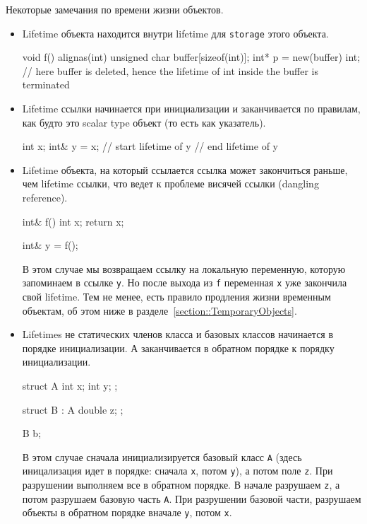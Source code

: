 \documentclass{article}
\begin{document}
Некоторые замечания по времени жизни объектов.
\begin{itemize}
\item Lifetime объекта находится внутри lifetime для \verb"storage" этого объекта.
\begin{cppcode}[\nonumbers]
void f() {
  alignas(int) unsigned char buffer[sizeof(int)];
  int* p = new(buffer) int;
} // here buffer is deleted, hence the lifetime of int inside the buffer is terminated
\end{cppcode}

\item Lifetime ссылки начинается при инициализации и заканчивается по правилам, как будто это scalar type объект (то есть как указатель).
\begin{cppcode}[\nonumbers]
int x;
{
  int& y = x; // start lifetime of y
}             // end lifetime of y
\end{cppcode}

\item Lifetime объекта, на который ссылается ссылка может закончиться раньше, чем lifetime ссылки, что ведет к проблеме висячей ссылки (dangling reference).
\begin{cppcode}[\nonumbers]
int& f() {
  int x;
  return x;
}

int& y = f();
\end{cppcode}
В этом случае мы возвращаем ссылку на локальную переменную, которую запоминаем в ссылке \verb"y".
Но после выхода из \verb"f" переменная \verb"x" уже закончила свой lifetime.
Тем не менее, есть правило продления жизни временным объектам, об этом ниже в разделе~\ref{section::TemporaryObjects}.

\item Lifetimes не статических членов класса и базовых классов начинается в порядке инициализации.
А заканчивается в обратном порядке к порядку инициализации.
\begin{cppcode}[\nonumbers]
struct A {
  int x;
  int y;
};

struct B : A {
  double z;
};

B b;
\end{cppcode}
В этом случае сначала инициализируется базовый класс \verb"A" (здесь иницализация идет в порядке: сначала \verb"x", потом \verb"y"), а потом поле \verb"z".
При разрушении выполняем все в обратном порядке.
В начале разрушаем \verb"z", а потом разрушаем базовую часть \verb"A".
При разрушении базовой части, разрушаем объекты в обратном порядке вначале \verb"y", потом \verb"x".
\end{itemize}
\end{document}
